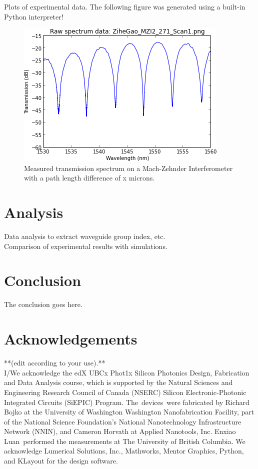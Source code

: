 Plots of experimental data. The following figure was generated using a
built-in Python interpreter!\\
\begin{figure}[h!]
\begin{center}
\includegraphics[width=0.70\columnwidth]{figures/download/download}
\caption{{Measured transmission spectrum on a Mach-Zehnder Interferometer with a path length difference of x microns.%
}}
\end{center}
\end{figure}

\section{Analysis}\label{analysis}

Data analysis to extract waveguide group index, etc.\\

Comparison of experimental results with simulations.\\

\section{Conclusion}
The conclusion goes here.



\section{Acknowledgements}\label{auto-label-section-544540}

**(edit according to your use).**\\

I/We acknowledge the edX UBCx Phot1x Silicon Photonics Design,
Fabrication and Data Analysis course, which is supported by the Natural
Sciences and Engineering Research Council of Canada (NSERC) Silicon
Electronic-Photonic Integrated Circuits (SiEPIC) Program.
The~devices~were fabricated by Richard Bojko at the University of
Washington Washington Nanofabrication Facility, part of the National
Science Foundation's National Nanotechnology Infrastructure Network
(NNIN), and Cameron Horvath at Applied Nanotools, Inc. Enxiao
Luan~performed the measurements at The University of British Columbia.
We acknowledge Lumerical Solutions, Inc., Mathworks, Mentor Graphics,
Python, and KLayout for the design software. ~

